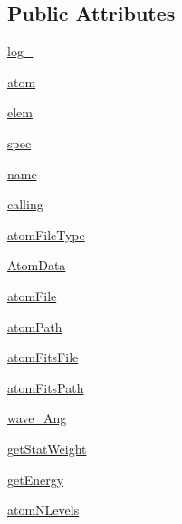 \subsection*{Public Attributes}
\begin{DoxyCompactItemize}
\item 
\hyperlink{classpyneb_1_1core_1_1pynebcore_1_1_atom_a9e2e5b5402bb9cf14c1b08684bccbf6b}{log\+\_\+}
\item 
\hyperlink{classpyneb_1_1core_1_1pynebcore_1_1_atom_a192f3e20446d7fba81d789bc705d6c71}{atom}
\item 
\hyperlink{classpyneb_1_1core_1_1pynebcore_1_1_atom_ae722bd0e35e1c8cdc0018d56c34171cf}{elem}
\item 
\hyperlink{classpyneb_1_1core_1_1pynebcore_1_1_atom_a02c0f7146a2f5b8eac765a453c763797}{spec}
\item 
\hyperlink{classpyneb_1_1core_1_1pynebcore_1_1_atom_aa8b43e1441b80824954f2f2fac4f2eba}{name}
\item 
\hyperlink{classpyneb_1_1core_1_1pynebcore_1_1_atom_a373b7735acf4f528b54bddf373ad67a1}{calling}
\item 
\hyperlink{classpyneb_1_1core_1_1pynebcore_1_1_atom_acb3c11139568e31337ac4c26d6aa57b8}{atom\+File\+Type}
\item 
\hyperlink{classpyneb_1_1core_1_1pynebcore_1_1_atom_a7246a8b1ce71eb9d38f580a6ca9fe09e}{Atom\+Data}
\item 
\hyperlink{classpyneb_1_1core_1_1pynebcore_1_1_atom_a0d74c41b1e0ac1a9cd5591467769d07f}{atom\+File}
\item 
\hyperlink{classpyneb_1_1core_1_1pynebcore_1_1_atom_a8c2ddffd0cd3f7ce2a089e87746e909f}{atom\+Path}
\item 
\hyperlink{classpyneb_1_1core_1_1pynebcore_1_1_atom_ada464bba6971f03f7fc1a51228b35f5d}{atom\+Fits\+File}
\item 
\hyperlink{classpyneb_1_1core_1_1pynebcore_1_1_atom_a8919c61156a1cbc2cfac6a6d9ee3b1f7}{atom\+Fits\+Path}
\item 
\hyperlink{classpyneb_1_1core_1_1pynebcore_1_1_atom_a044e1349bb63766a5f3d25fbf04b5c2c}{wave\+\_\+\+Ang}
\item 
\hyperlink{classpyneb_1_1core_1_1pynebcore_1_1_atom_a0f2483487115f19556586b9e422bd5fb}{get\+Stat\+Weight}
\item 
\hyperlink{classpyneb_1_1core_1_1pynebcore_1_1_atom_a9940acb2999e864edf9761d822e65d7f}{get\+Energy}
\item 
\hyperlink{classpyneb_1_1core_1_1pynebcore_1_1_atom_a16e5ede01345c370f0893b19ffb20c5c}{atom\+N\+Levels}

\end{DoxyCompactItemize}
